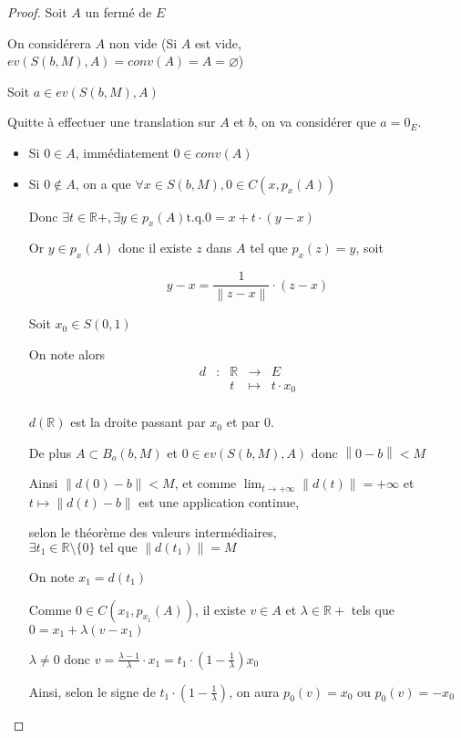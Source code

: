 \documentclass[a4paper]{article}
\newcommand{\norm}[1]{\left\lVert#1\right\rVert}
\begin{document}
\begin{proof}
Soit $A$ un fermé de $E$

On considérera $A$ non vide (Si $A$ est vide, $ev(S(b, M), A) = conv(A) = A = \varnothing$)

Soit $a \in ev(S(b, M), A)$

Quitte à effectuer une translation sur $A$ et $b$, on va considérer que $a = 0_{E}$.

\begin{itemize}
\item Si $0 \in A$, immédiatement $0 \in conv(A)$
\item Si $0 \notin A$, on a que $\forall x \in S(b, M), 0 \in C(x, p_{x}(A))$

Donc $\exists t \in \mathbb{R}+, \exists y\in p_{x}(A) \text{t.q.} 0 = x + t \cdot (y - x)$

Or $y \in p_{x}(A)$ donc il existe $z$ dans $A$ tel que $p_{x}(z) = y$, soit

\[y - x = \frac{1}{\norm{z - x}} \cdot (z - x)\]


Soit $x_{0} \in S(0, 1)$

On note alors
\[\begin{array}{ccccc}
d& : & \mathbb{R} & \to & E \\
 & & t & \mapsto & t \cdot x_{0} \\
\end{array}\]

$d(\mathbb{R})$ est la droite passant par $x_{0}$  et par $0$.

De plus $A \subset B_{o}(b, M)$ et $0 \in ev(S(b, M), A)$ donc $\norm{0 - b} < M$

Ainsi $\norm{d(0) - b} < M$, et comme $\lim_{t \to +\infty}\norm{d(t)} = +\infty$ et $t \mapsto \norm{d(t) - b}$ est une application continue,

selon le théorème des valeurs intermédiaires, $\exists t_{1} \in \mathbb{R}\setminus\{0\} \text{ tel que } \norm{d(t_{1})} = M$

On note $x_{1} = d(t_{1})$

Comme $0 \in C(x_{1}, p_{x_{1}}(A))$, il existe $v \in A$ et $\lambda \in \mathbb{R}+$ tels que $0 = x_{1} + \lambda (v - x_{1})$

$\lambda \neq 0$ donc $v = \frac{\lambda - 1}{\lambda} \cdot x_{1} = t_{1} \cdot (1 - \frac{1}{\lambda}) x_{0}$

Ainsi, selon le signe de $t_{1} \cdot (1 - \frac{1}{\lambda})$, on aura $p_{0}(v) = x_{0}$ ou $p_{0}(v) = - x_{0}$


\end{itemize}
\end{proof}
\end{document}
